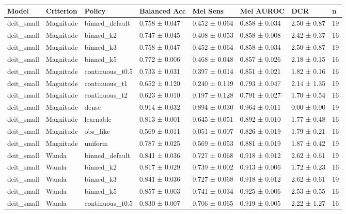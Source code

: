 \begin{table}[t]
\centering
\small
\begin{tabular}{llllllll}
\toprule
Model & Criterion & Policy & Balanced Acc & Mel Sens & Mel AUROC & DCR & n \\
\midrule
deit\_small & Magnitude & binned\_default & 0.758 ± 0.047 & 0.452 ± 0.064 & 0.858 ± 0.034 & 2.50 ± 0.87 & 19 \\
deit\_small & Magnitude & binned\_k2 & 0.747 ± 0.045 & 0.408 ± 0.053 & 0.858 ± 0.008 & 2.42 ± 0.37 & 16 \\
deit\_small & Magnitude & binned\_k3 & 0.758 ± 0.047 & 0.452 ± 0.064 & 0.858 ± 0.034 & 2.50 ± 0.87 & 19 \\
deit\_small & Magnitude & binned\_k5 & 0.772 ± 0.006 & 0.468 ± 0.048 & 0.857 ± 0.026 & 2.18 ± 0.15 & 16 \\
deit\_small & Magnitude & continuous\_t0.5 & 0.733 ± 0.031 & 0.397 ± 0.014 & 0.851 ± 0.021 & 1.82 ± 0.16 & 16 \\
deit\_small & Magnitude & continuous\_t1 & 0.652 ± 0.120 & 0.240 ± 0.119 & 0.793 ± 0.047 & 2.14 ± 1.35 & 19 \\
deit\_small & Magnitude & continuous\_t2 & 0.623 ± 0.010 & 0.197 ± 0.128 & 0.791 ± 0.027 & 1.70 ± 0.54 & 16 \\
deit\_small & Magnitude & dense & 0.914 ± 0.032 & 0.894 ± 0.030 & 0.964 ± 0.011 & 0.00 ± 0.00 & 19 \\
deit\_small & Magnitude & learnable & 0.813 ± 0.001 & 0.645 ± 0.051 & 0.892 ± 0.010 & 1.77 ± 0.48 & 16 \\
deit\_small & Magnitude & obs\_like & 0.569 ± 0.011 & 0.051 ± 0.007 & 0.826 ± 0.019 & 1.79 ± 0.21 & 16 \\
deit\_small & Magnitude & uniform & 0.787 ± 0.025 & 0.569 ± 0.053 & 0.881 ± 0.019 & 1.87 ± 0.42 & 19 \\
deit\_small & Wanda & binned\_default & 0.841 ± 0.036 & 0.727 ± 0.068 & 0.918 ± 0.012 & 2.62 ± 0.61 & 19 \\
deit\_small & Wanda & binned\_k2 & 0.817 ± 0.029 & 0.739 ± 0.002 & 0.913 ± 0.006 & 1.72 ± 0.23 & 16 \\
deit\_small & Wanda & binned\_k3 & 0.841 ± 0.036 & 0.727 ± 0.068 & 0.918 ± 0.012 & 2.62 ± 0.61 & 19 \\
deit\_small & Wanda & binned\_k5 & 0.857 ± 0.003 & 0.741 ± 0.034 & 0.925 ± 0.006 & 2.53 ± 0.55 & 16 \\
deit\_small & Wanda & continuous\_t0.5 & 0.830 ± 0.007 & 0.706 ± 0.065 & 0.919 ± 0.005 & 2.22 ± 1.27 & 16 \\

\end{tabular}
\end{table}
